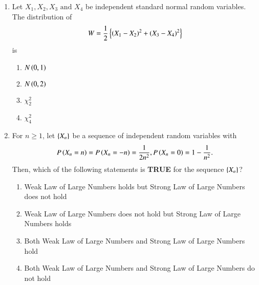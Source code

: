 \documentclass[journal,12pt,onecolumn]{IEEEtran}
\theoremstyle{remark}
\begin{document}
\begin{enumerate}
\item Let $X_1,X_2,X_3 \text{ and } X_4$ be independent standard normal random variables. The distribution of
\begin{align*}
W = \frac{1}{2}\left\{\left(X_1-X_2\right)^2 + \left(X_3-X_4\right)^2\right\}
\end{align*} is
\begin{enumerate}
\item $N\left(0,1\right)$
\item $N\left(0,2\right)$
\item $\chi_{2}^{2}$
\item $\chi_{4}^{2}$
\end{enumerate}

\item For $n\geq 1$, let $\left\{X_n\right\}$ be a sequence of independent random variables with
\begin{align*}
	P\left(X_n = n\right) = P\left(X_n = -n\right) = \frac{1}{2n^2}, P\left(X_n = 0\right) = 1 - \frac{1}{n^2}.
\end{align*}
Then, which of the following statements is \textbf{TRUE} for the sequence $\left\{X_n\right\}$?
\begin{enumerate}
\item Weak Law of Large Numbers holds but Strong Law of Large Numbers does not hold
\item Weak Law of Large Numbers does not hold but Strong Law of Large Numbers holds
\item Both Weak Law of Large Numbers and Strong Law of Large Numbers hold
\item Both Weak Law of Large Numbers and Strong Law of Large Numbers do not hold
\end{enumerate}

\end{enumerate}
\end{document}
